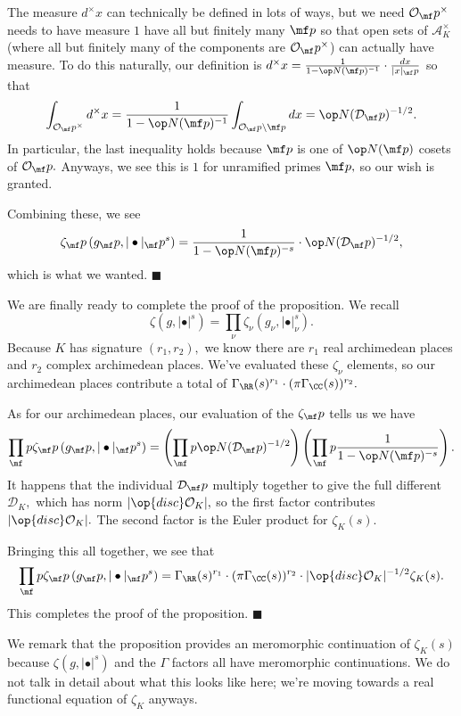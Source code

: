 The measure $d^\times x$ can technically be defined in lots of ways, but we need $\mathcal O_\mf p^\times$ needs to have measure $1$ have all but finitely many $\mf p$ so that open sets of $\mathcal A_K^\times$ (where all but finitely many of the components are $\mathcal O_\mf p^\times$) can actually have measure. To do this naturally, our definition is $d^\times x=\frac1{1-\op N(\mf p)^{-1}}\cdot\frac{dx}{|x|_\mf p}$ so that
\[\int_{\mathcal O_\mf p^\times}d^\times x=\frac1{1-\op N(\mf p)^{-1}}\int_{\mathcal O_\mf p\setminus\mf p}dx=\op N(\mathcal D_\mf p)^{-1/2}.\]
In particular, the last inequality holds because $\mf p$ is one of $\op N(\mf p)$ cosets of $\mathcal O_\mf p.$ Anyways, we see this is $1$ for unramified primes $\mf p,$ so our wish is granted.

Combining these, we see
\[\zeta_\mf p\left(g_\mf p,|\bullet|_\mf p^s\right)=\frac1{1-\op N(\mf p)^{-s}}\cdot\op N(\mathcal D_\mf p)^{-1/2},\]
which is what we wanted. $\blacksquare$

We are finally ready to complete the proof of the proposition. We recall
\[\zeta\left(g,|\bullet|^s\right)=\prod_\nu\zeta_\nu\left(g_\nu,|\bullet|_\nu^s\right).\]
Because $K$ has signature $(r_1,r_2),$ we know there are $r_1$ real archimedean places and $r_2$ complex archimedean places. We've evaluated these $\zeta_\nu$ elements, so our archimedean places contribute a total of $\Gamma_\RR(s)^{r_1}\cdot(\pi\Gamma_\CC(s))^{r_2}.$

As for our archimedean places, our evaluation of the $\zeta_\mf p$ tells us we have
\[\prod_\mf p\zeta_\mf p\left(g_\mf p,|\bullet|_\mf p^s\right)=\left(\prod_\mf p\op N(\mathcal D_\mf p)^{-1/2}\right)\left(\prod_\mf p\frac1{1-\op N(\mf p)^{-s}}\right).\]
It happens that the individual $\mathcal D_\mf p$ multiply together to give the full different $\mathcal D_K,$ which has norm $|\op{disc}\mathcal O_K|,$ so the first factor contributes $|\op{disc}\mathcal O_K|.$ The second factor is the Euler product for $\zeta_K(s).$

Bringing this all together, we see that
\[\prod_\mf p\zeta_\mf p\left(g_\mf p,|\bullet|_\mf p^s\right)=\Gamma_\RR(s)^{r_1}\cdot(\pi\Gamma_\CC(s))^{r_2}\cdot|\op{disc}\mathcal O_K|^{-1/2}\zeta_K(s).\]
This completes the proof of the proposition. $\blacksquare$

We remark that the proposition provides an meromorphic continuation of $\zeta_K(s)$ because $\zeta\left(g,|\bullet|^s\right)$ and the $\Gamma$ factors all have meromorphic continuations. We do not talk in detail about what this looks like here; we're moving towards a real functional equation of $\zeta_K$ anyways.

